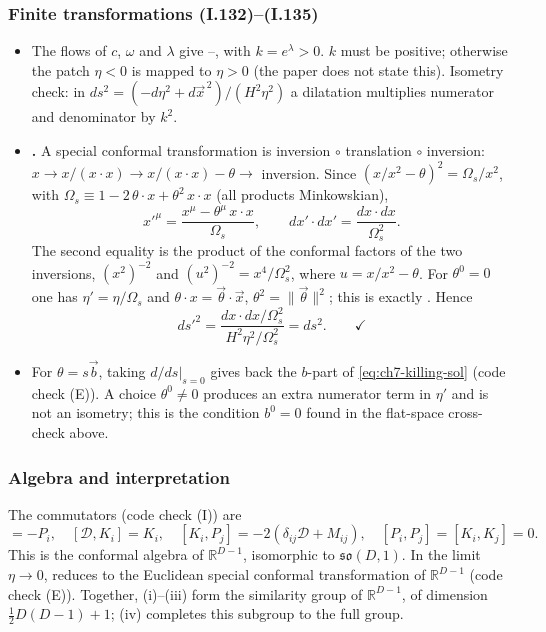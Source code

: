 \subsubsection{Finite transformations (I.132)--(I.135)}
\tD{}
\begin{itemize}[leftmargin=14pt]
\item The flows of $c$, $\omega$ and $\lambda$ give --, with $k=e^\lambda>0$.
$k$ must be positive; otherwise the patch $\eta<0$ is mapped to $\eta>0$ (the paper does not state this).
Isometry check: in $ds^2=(-d\eta^2+d\vec x^{\,2})/(H^2\eta^2)$ a dilatation multiplies numerator and denominator by $k^2$. \checkmark
\item \textbf{.} A special conformal transformation is inversion $\circ$ translation $\circ$ inversion:
$x\to x/(x\cdot x)\to x/(x\cdot x)-\theta\to$ inversion.
Since $(x/x^2-\theta)^2=\Omega_s/x^2$, with $\Omega_s\equiv1-2\,\theta\cdot x+\theta^2\,x\cdot x$ (all products Minkowskian),
\begin{equation}
x'^\mu=\frac{x^\mu-\theta^\mu\,x\cdot x}{\Omega_s},\qquad dx'\cdot dx'=\frac{dx\cdot dx}{\Omega_s^2} .
\label{eq:ch7-sct}
\end{equation}
The second equality is the product of the conformal factors of the two inversions, $(x^2)^{-2}$ and $(u^2)^{-2}=x^4/\Omega_s^2$, where $u=x/x^2-\theta$.
For $\theta^0=0$ one has $\eta'=\eta/\Omega_s$ and $\theta\cdot x=\vec\theta\cdot\vec x$, $\theta^2=\|\vec\theta\|^2$; this is exactly .
Hence
\begin{equation*}
ds'^2=\frac{dx\cdot dx/\Omega_s^2}{H^2\eta^2/\Omega_s^2}=ds^2. \qquad\checkmark
\end{equation*}
\item For $\theta=s\vec b$, taking $d/ds|_{s=0}$ gives back the $b$-part of \eqref{eq:ch7-killing-sol} \checkmark{} (code check (E)).
A choice $\theta^0\neq0$ produces an extra numerator term in $\eta'$ and is not an isometry; this is the condition $b^0=0$ found in the flat-space cross-check above.
\end{itemize}

\subsubsection{Algebra and interpretation}
\tD{}
The commutators (code check (I)) are
\begin{equation}
[\mathcal D,P_i]=-P_i,\quad[\mathcal D,K_i]=K_i,\quad[K_i,P_j]=-2(\delta_{ij}\mathcal D+M_{ij}),\quad[P_i,P_j]=[K_i,K_j]=0 .
\label{eq:ch7-algebra}
\end{equation}
This is the conformal algebra of $\mathbb R^{D-1}$, isomorphic to $\mathfrak{so}(D,1)$.
In the limit $\eta\to0$,  reduces to the Euclidean special conformal transformation of $\mathbb R^{D-1}$ (code check (E)).
Together, (i)--(iii) form the similarity group of $\mathbb R^{D-1}$, of dimension $\tfrac12D(D-1)+1$; (iv) completes this subgroup to the full group.

